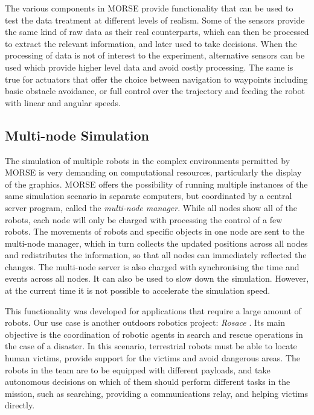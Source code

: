 \documentclass{llncs}
\begin{document}
The various components in MORSE provide functionality that can be used to test
the data treatment at different levels of realism. Some of the sensors provide
the same kind of raw data as their real counterparts, which can then be
processed to extract the relevant information, and later used to take
decisions. When the processing of data is not of interest to the experiment,
alternative sensors can be used which provide higher level data and avoid
costly processing. The same is true for actuators that offer the choice
between navigation to waypoints including basic obstacle avoidance, or full
control over the trajectory and feeding the robot with linear and angular
speeds.


%
%


\subsection{Multi-node Simulation}
\label{section:multinode}

The simulation of multiple robots in the complex environments permitted by
MORSE is very demanding on computational resources, particularly the
display of the graphics. MORSE offers the possibility of running multiple
instances of the same simulation scenario in separate computers, but
coordinated by a central server program, called the \emph{multi-node
manager}. While all nodes show all of the robots, each node will only
be charged with processing the control of a few robots. The movements
of robots and specific objects in one node are sent to the multi-node
manager, which in turn collects the updated positions across all nodes
and redistributes the information, so that all nodes can immediately
reflected the changes.  The multi-node server is also charged with
synchronising the time and events across all nodes. It can also be used
to slow down the simulation. However, at the current time it is not
possible to accelerate the simulation speed.

This functionality was developed for applications that require a large amount
of robots. Our use case is another outdoors robotics project: \emph{Rosace}
\cite{springerlink:10.1007/978-3-642-12384-9_18,springerlink:10.1007/978-3-642-28786-2_32}.
Its main objective is the coordination of robotic agents in search and rescue
operations in the case of a disaster. In this scenario, terrestrial robots must
be able to locate human victims, provide support for the victims and avoid
dangerous areas. The robots in the team are to be equipped with different
payloads, and take autonomous decisions on which of them should perform
different tasks in the mission, such as searching, providing a communications
relay, and helping victims directly.
\end{document}
